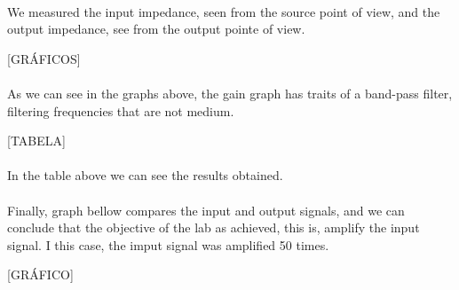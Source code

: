 \paragraph{} We measured the input impedance, seen from the source point of view, and the output impedance, see from the output pointe of view.

[GRÁFICOS]

\paragraph{} As we can see in the graphs above, the gain graph has traits of a band-pass filter, filtering frequencies that are not medium.

[TABELA]

\paragraph{} In the table above we can see the results obtained.

\paragraph{} Finally, graph bellow compares the input and output signals, and we can conclude that the objective of the lab as achieved, this is, amplify the input signal. I this case, the imput signal 
was amplified 50 times.

[GRÁFICO]
